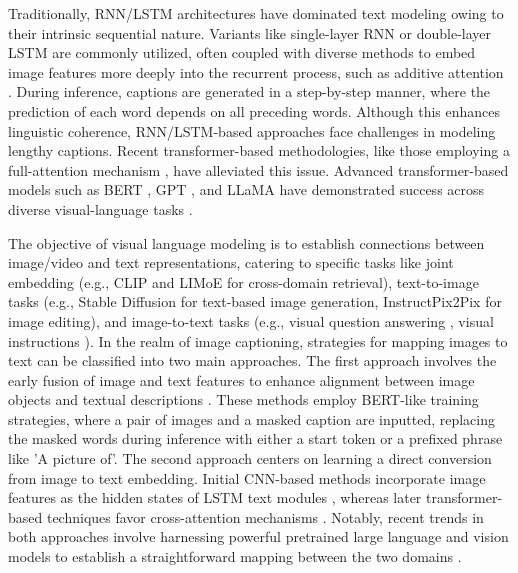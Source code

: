 \documentclass[10pt,twocolumn,letterpaper]{article}
\begin{document}
Traditionally, RNN/LSTM architectures \cite{graves2012long} have dominated text modeling owing to their intrinsic sequential nature. Variants like single-layer RNN \cite{vinyals2015show,mao2014deep} or double-layer LSTM \cite{donahue2015long,anderson2018bottom,yao2019hierarchy} are commonly utilized, often coupled with diverse methods to embed image features more deeply into the recurrent process, such as additive attention \cite{stefanini2022show}. During inference, captions are generated in a step-by-step manner, where the prediction of each word depends on all preceding words. Although this enhances linguistic coherence, RNN/LSTM-based approaches face challenges in modeling lengthy captions. Recent transformer-based methodologies, like those employing a full-attention mechanism \cite{luo2021dual,wang2021simvlm,cornia2020meshed}, have alleviated this issue. Advanced transformer-based models such as BERT \cite{devlin2018bert}, GPT \cite{gpt-3}, and LLaMA \cite{llama} have demonstrated success across diverse visual-language tasks \cite{hu2022scaling,mokady2021clipcap,gao2023llama,zhang2021vinvl,li2020oscar}.  


The objective of visual language modeling is to establish connections between image/video and text representations, catering to specific tasks like joint embedding (e.g., CLIP \cite{CLIP} and LIMoE \cite{limoe} for cross-domain retrieval), text-to-image tasks (e.g., Stable Diffusion \cite{sd} for text-based image generation, InstructPix2Pix \cite{ip2p} for image editing), and image-to-text tasks (e.g., visual question answering \cite{flamingo,wang2021simvlm}, visual instructions \cite{gao2023llama,palme}). In the realm of image captioning, strategies for mapping images to text can be classified into two main approaches. The first approach involves the early fusion of image and text features to enhance alignment between image objects and textual descriptions \cite{frozen,mokady2021clipcap,wang2021simvlm,li2020oscar}. These methods employ BERT-like training strategies, where a pair of images and a masked caption are inputted, replacing the masked words during inference with either a start token or a prefixed phrase like 'A picture of'. The second approach centers on learning a direct conversion from image to text embedding. Initial CNN-based methods incorporate image features as the hidden states of LSTM text modules \cite{donahue2015long,vinyals2015show,yao2019hierarchy,karpathy2015deep,rennie2017self}, whereas later transformer-based techniques favor cross-attention mechanisms \cite{luo2021dual,cornia2020meshed}. Notably, recent trends in both approaches involve harnessing powerful pretrained large language and vision models to establish a straightforward mapping between the two domains \cite{LIMBER,MAGMA,blip2,frozen,mokady2021clipcap,minigpt}.
\end{document}
